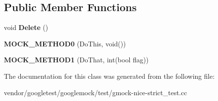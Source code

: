 \subsection*{Public Member Functions}
\begin{DoxyCompactItemize}
\item 
\mbox{\label{classtesting_1_1gmock__nice__strict__test_1_1_mock_foo_a7bdec6a6353e4396d551dbf8f2beac54}} 
void {\bfseries Delete} ()
\item 
\mbox{\label{classtesting_1_1gmock__nice__strict__test_1_1_mock_foo_a14ee661ebc461096824e876a9308840e}} 
{\bfseries M\+O\+C\+K\+\_\+\+M\+E\+T\+H\+O\+D0} (Do\+This, void())
\item 
\mbox{\label{classtesting_1_1gmock__nice__strict__test_1_1_mock_foo_a3a7bfcf303a2c8578db900c9525b02a1}} 
{\bfseries M\+O\+C\+K\+\_\+\+M\+E\+T\+H\+O\+D1} (Do\+That, int(bool flag))
\end{DoxyCompactItemize}


The documentation for this class was generated from the following file\+:\begin{DoxyCompactItemize}
\item 
vendor/googletest/googlemock/test/gmock-\/nice-\/strict\+\_\+test.\+cc\end{DoxyCompactItemize}
